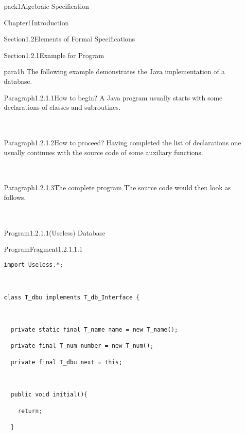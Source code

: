 \documentclass[landscape, slides, light]{mmiss2}
\begin{document}
\begin{Package}{pack1}{Algebraic
Specification}
\begin{Section}{Chapter1}{Introduction}
\begin{Section}{Section1.2}{Elements of Formal Specifications}{}
\begin{Section}{Section1.2.1}{Example for Program}{}
\begin{Paragraph}{para1b}{}{}
The following example demonstrates the Java implementation of a
database.
\end{Paragraph}
\begin{Paragraph}{Paragraph1.2.1.1}{How to begin?}{}
A Java program usually starts with some declarations of classes and
subroutines.
\newline
\hfill \\
\hfill \\
\hfill \\
\end{Paragraph}
\begin{Paragraph}{Paragraph1.2.1.2}{How to proceed?}{}
Having completed the list of declarations one usually continues with
the source code of some auxiliary functions.
\newline
\hfill \\
\hfill \\
\hfill \\
\end{Paragraph}
\begin{Paragraph}{Paragraph1.2.1.3}{The complete program}{}
The source code would then look as follows.
\newline
\hfill \\
\hfill \\
\hfill \\
\begin{Program}{Program1.2.1.1}{(Useless) Database}{}
\begin{ProgramFragment}{ProgramFragment1.2.1.1.1}{}{}
\tiny
\begin{verbatim}
import Useless.*;



class T_dbu implements T_db_Interface {



  private static final T_name name = new T_name();

  private final T_num number = new T_num();

  private final T_dbu next = this;



  public void initial(){

    return;

  }




\end{verbatim}
\end{ProgramFragment}
\end{Program}
\end{Paragraph}
\end{Section}
\end{Section}
\end{Section}
\end{Package}
\end{document}
